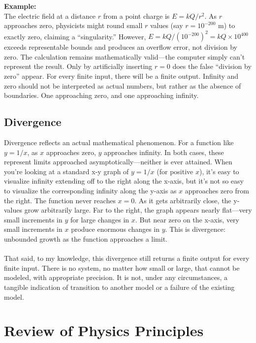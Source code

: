 \documentclass[twoside,twocolumn,9pt]{article}
\begin{document}
\noindent\textbf{Example:}\\
The electric field at a distance $r$ from a point charge is $E = kQ/r^2$. As $r$ approaches zero, physicists might round small $r$ values (say $r = 10^{-200}$ m) to exactly zero, claiming a ``singularity.'' However, $E = kQ/(10^{-200})^2 = kQ \times 10^{400}$ exceeds representable bounds and produces an overflow error, not division by zero. The calculation remains mathematically valid---the computer simply can't represent the result. Only by artificially inserting $r = 0$ does the false ``division by zero'' appear. For every finite input, there will be a finite output. Infinity and zero should not be interpreted as actual numbers, but rather as the absence of boundaries. One approaching zero, and one approaching infinity.

\subsection{Divergence}
Divergence reflects an actual mathematical phenomenon. For a function like $y = 1/x$, as $x$ approaches zero, $y$ approaches infinity. In both cases, these represent limits approached asymptotically---neither is ever attained. When you're looking at a standard x-y graph of $y = 1/x$ (for positive $x$), it's easy to visualize infinity extending off to the right along the x-axis, but it's not so easy to visualize the corresponding infinity along the y-axis as $x$ approaches zero from the right. The function never reaches $x = 0$. As it gets arbitrarily close, the y-values grow arbitrarily large. Far to the right, the graph appears nearly flat---very small increments in $y$ for large changes in $x$. But near zero on the x-axis, very small increments in $x$ produce enormous changes in $y$. This is divergence: unbounded growth as the function approaches a limit.\\
\\
That said, to my knowledge, this divergence still returns a finite output for every finite input. There is no system, no matter how small or large, that cannot be modeled, with appropriate precision. It is not, under any circumstances, a tangible indication of transition to another model or a failure of the existing model.

\vspace{1em}
\section{Review of Physics Principles}
\nopagebreak[4]
\end{document}
